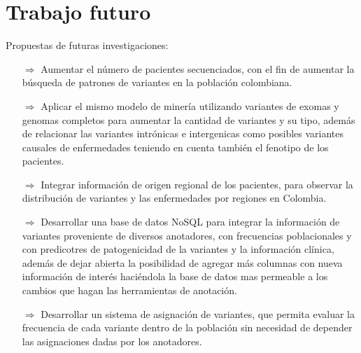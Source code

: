 \section{Trabajo futuro}

Propuestas de futuras investigaciones:

\begin{itemize}
	\item[$\Rightarrow$] Aumentar el número de pacientes secuenciados, con el fin de aumentar la búsqueda de patrones de variantes en la población colombiana.
	
	\item[$\Rightarrow$] Aplicar el mismo modelo de minería utilizando variantes de exomas  y genomas completos para aumentar la cantidad de variantes y su tipo, además de relacionar las variantes intrónicas e intergenicas como posibles variantes causales de enfermedades teniendo en cuenta también el fenotipo de los pacientes.
	
	\item[$\Rightarrow$] Integrar información de origen regional de los pacientes, para observar la distribución de variantes  y las enfermedades por regiones en Colombia.
	
	\item[$\Rightarrow$] Desarrollar una base de datos NoSQL para integrar la información de variantes proveniente de diversos anotadores, con frecuencias poblacionales y con predicotres de patogenicidad de la variantes y la información clínica, además de dejar abierta la posibilidad de agregar más columnas con nueva información de interés haciéndola la base de datos mas permeable a los cambios que hagan las herramientas de anotación. 
	
	\item[$\Rightarrow$] Desarrollar un sistema de asignación de variantes, que permita evaluar la frecuencia de cada variante dentro de la población sin necesidad de depender las asignaciones dadas por los anotadores.

\end{itemize}
